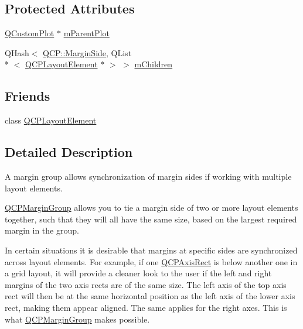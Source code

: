 \subsection*{Protected Attributes}
\begin{DoxyCompactItemize}
\item 
\hyperlink{class_q_custom_plot}{Q\-Custom\-Plot} $\ast$ \hyperlink{class_q_c_p_margin_group_a23cfa29e3cc0f33a59141b77d8c04edf}{m\-Parent\-Plot}
\item 
Q\-Hash$<$ \hyperlink{namespace_q_c_p_a7e487e3e2ccb62ab7771065bab7cae54}{Q\-C\-P\-::\-Margin\-Side}, Q\-List\\*
$<$ \hyperlink{class_q_c_p_layout_element}{Q\-C\-P\-Layout\-Element} $\ast$ $>$ $>$ \hyperlink{class_q_c_p_margin_group_a954bc89ff8958b9bb6a4a0d08ed5fc0f}{m\-Children}
\end{DoxyCompactItemize}
\subsection*{Friends}
\begin{DoxyCompactItemize}
\item 
class \hyperlink{class_q_c_p_margin_group_a0790750c7e7f14fdbd960d172655b42b}{Q\-C\-P\-Layout\-Element}
\end{DoxyCompactItemize}


\subsection{Detailed Description}
A margin group allows synchronization of margin sides if working with multiple layout elements. 

\hyperlink{class_q_c_p_margin_group}{Q\-C\-P\-Margin\-Group} allows you to tie a margin side of two or more layout elements together, such that they will all have the same size, based on the largest required margin in the group.

\par
 \par


In certain situations it is desirable that margins at specific sides are synchronized across layout elements. For example, if one \hyperlink{class_q_c_p_axis_rect}{Q\-C\-P\-Axis\-Rect} is below another one in a grid layout, it will provide a cleaner look to the user if the left and right margins of the two axis rects are of the same size. The left axis of the top axis rect will then be at the same horizontal position as the left axis of the lower axis rect, making them appear aligned. The same applies for the right axes. This is what \hyperlink{class_q_c_p_margin_group}{Q\-C\-P\-Margin\-Group} makes possible.

